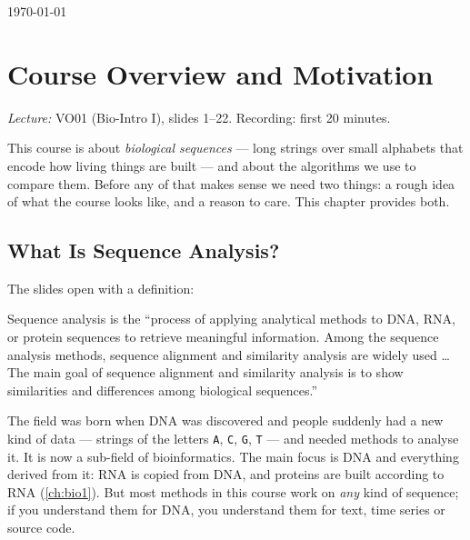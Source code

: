 \documentclass[11pt, oneside]{book}
\newcommand{\seq}[1]{\texttt{#1}}
\newcommand{\lectureref}[1]{%
  \par{\small\color{gray!70!black}\textit{Lecture:} #1}\par}
\let\originalsection\section
\renewcommand{\section}{\Needspace{7\baselineskip}\originalsection}
\begin{document}
\vfill
{\centering\small\color{gray!65} \today\par}
\clearpage


\setcounter{tocdepth}{1}  %

\begingroup
  \let\cleardoublepage\relax
  \let\clearpage\relax
  \tableofcontents
\endgroup

\mainmatter  %


\chapter{Course Overview and Motivation}
\label{ch:intro}

\lectureref{VO01 (Bio-Intro I), slides 1--22. Recording: first 20 minutes.}

This course is about \emph{biological sequences} --- long strings over small
alphabets that encode how living things are built --- and about the
algorithms we use to compare them. Before any of that makes sense we need
two things: a rough idea of what the course looks like, and a reason to care.
This chapter provides both.

\section{What Is Sequence Analysis?}

The slides open with a definition:

\begin{defbox}[title={Sequence analysis}]
Sequence analysis is the ``process of applying analytical methods to DNA,
RNA, or protein sequences to retrieve meaningful information. Among the
sequence analysis methods, sequence alignment and similarity analysis are
widely used \ldots{} The main goal of sequence alignment and similarity
analysis is to show similarities and differences among biological
sequences.''
\end{defbox}

The field was born when DNA was discovered and people suddenly had a new kind
of data --- strings of the letters \seq{A}, \seq{C}, \seq{G}, \seq{T} ---
and needed methods to analyse it. It is now a sub-field of bioinformatics.
The main focus is DNA and everything derived from it: RNA is copied from DNA,
and proteins are built according to RNA (\cref{ch:bio1}). But most methods in
this course work on \emph{any} kind of sequence; if you understand them for
DNA, you understand them for text, time series or source code.
\end{document}

